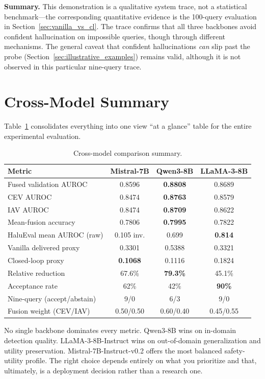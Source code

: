 \textbf{Summary.} This demonstration is a qualitative system trace, not a statistical benchmark—the corresponding quantitative evidence is the 100-query evaluation in Section~\ref{sec:vanilla_vs_cl}. The trace confirms that all three backbones avoid confident hallucination on impossible queries, though through different mechanisms. The general caveat that confident hallucinations \emph{can} slip past the probe (Section~\ref{sec:illustrative_examples}) remains valid, although it is not observed in this particular nine-query trace.

\section{Cross-Model Summary}
\label{sec:cross_model_summary}

Table~\ref{tab:cross_model} consolidates everything into one view ``at a glance'' table for the entire experimental evaluation.

\begin{table}[!htb]
\centering
\caption{Cross-model comparison summary.}
\label{tab:cross_model}
\begin{tabular}{@{}lccc@{}}
\toprule
\textbf{Metric} & \textbf{Mistral-7B} & \textbf{Qwen3-8B} & \textbf{LLaMA-3-8B} \\
\midrule
Fused validation AUROC    & 0.8596 & \textbf{0.8808} & 0.8689 \\
CEV AUROC                 & 0.8474 & \textbf{0.8763} & 0.8579 \\
IAV AUROC                 & 0.8474 & \textbf{0.8709} & 0.8622 \\
Mean-fusion accuracy      & 0.7806 & \textbf{0.7995} & 0.7822 \\
HaluEval mean AUROC (raw) & 0.105 inv. & 0.699 & \textbf{0.814} \\
Vanilla delivered proxy   & 0.3301 & 0.5388 & 0.3321 \\
Closed-loop proxy         & \textbf{0.1068} & 0.1116 & 0.1824 \\
Relative reduction        & 67.6\% & \textbf{79.3\%} & 45.1\% \\
Acceptance rate           & 62\% & 42\% & \textbf{90\%} \\
Nine-query (accept/abstain) & 9/0 & 6/3 & 9/0 \\
Fusion weight (CEV/IAV)   & 0.50/0.50 & 0.60/0.40 & 0.45/0.55 \\
\bottomrule
\end{tabular}
\end{table}

No single backbone dominates every metric. Qwen3-8B wins on in-domain detection quality. LLaMA-3-8B-Instruct wins on out-of-domain generalization and utility preservation. Mistral-7B-Instruct-v0.2 offers the most balanced safety-utility profile. The right choice depends entirely on what you prioritize and that, ultimately, is a deployment decision rather than a research one.